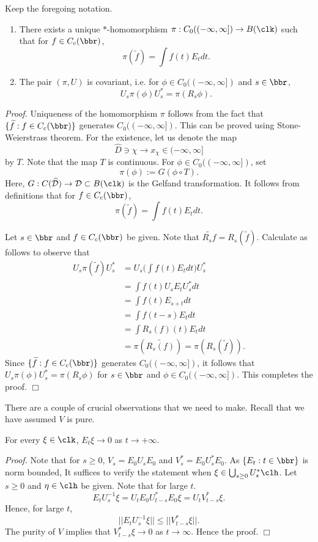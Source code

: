 \begin{ppsn}
\label{covariant Cooper}
Keep the foregoing notation. 
\begin{enumerate}
\item[(1)] There exists a unique $*$-homomorphism $\pi:C_0((-\infty,\infty]) \to B(\clk)$ such that for $f \in C_{c}(\bbr)$, 
\[
\pi(\widetilde{f})=\int f(t)E_t dt.\]
\item[(2)] The pair $(\pi,U)$ is covariant, i.e. for $\phi \in C_0((-\infty,\infty])$ and $s \in \bbr$, 
\[
U_s\pi(\phi)U_s^{*}=\pi(R_s\phi).\]
\end{enumerate}
\end{ppsn}
\textit{Proof.} Uniqueness of the homomorphism $\pi$ follows from the fact that $\{\widetilde{f}:f \in C_{c}(\bbr)\}$ generates $C_0((-\infty,\infty])$. This can be proved using Stone-Weierstrass theorem. For the existence, let us denote the map 
\[
\widehat{D} \ni \chi \to x_\chi \in (-\infty,\infty]\]
by $T$. Note that the map $T$ is continuous. For $\phi \in C_0((-\infty,\infty])$, set \[\pi(\phi):=G(\phi \circ T).\] Here, $G: C(\widehat{\mathcal{D}}) \to \mathcal{D} \subset B(\clk)$ is the Gelfand transformation. It follows from definitions that for $f \in C_{c}(\bbr)$, 
\[
\pi(\widetilde{f})=\int f(t)E_t dt.\]

Let $s \in \bbr$ and $f \in C_{c}(\bbr)$ be given. Note that $\widetilde{R_sf}=R_s(\widetilde{f})$. Calculate as follows to observe that 
\begin{align*}
U_s\pi(\widetilde{f})U_s^{*}&=U_{s} \Big (\int f(t)E_tdt\Big)U_{s}^{*}\\
&=\int f(t)U_sE_tU_s^{*}dt\\
&=\int f(t)E_{s+t}dt\\
&=\int f(t-s)E_tdt\\
&=\int R_s(f)(t)E_tdt\\
&=\pi(\widetilde{R_s(f)})=\pi(R_s(\widetilde{f})).
\end{align*}
Since $\{\widetilde{f}:f \in C_{c}(\bbr)\}$ generates $C_0((-\infty,\infty])$, it follows that $U_s\pi(\phi)U_{s}^{*}=\pi(R_s\phi)$ for $s \in \bbr$ and $\phi \in C_0((-\infty,\infty])$. This completes the proof. \hfill $\Box$

There are a couple of crucial observations that we need to make. Recall that we have assumed $V$ is pure. 
\begin{lmma}
\label{Cooper vanishing at infinity}
For every $\xi \in \clk$, $E_t\xi \to 0$ as $t \to +\infty$.
\end{lmma}
\textit{Proof.} Note that for $s \geq 0$, $V_s=E_0U_sE_0$ and $V_{s}^{*}=E_0U_s^*E_0$. 
As $\{E_t:t \in \bbr\}$ is norm bounded,  It suffices to verify the statement when $\xi \in \bigcup_{s \geq 0}U_{s}^{*}\clh$. Let $s \geq 0$ and $\eta \in \clh$ be given. Note that for large $t$.
\[
E_{t}U_{s}^{-1}\xi=U_{t}E_0U_{t-s}^{*}E_0\xi=U_{t}V_{t-s}^{*}\xi.\]
Hence, for large $t$, 
\[
||E_{t}U_{s}^{-1}\xi|| \leq ||V_{t-s}^{*}\xi||.\]
The purity of $V$ implies that $V_{t-s}^{*}\xi \to 0$ as $t \to \infty$. Hence the proof. \hfill $\Box$


